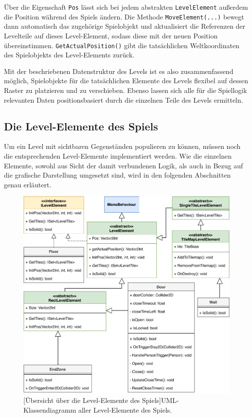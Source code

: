 Über die Eigenschaft \texttt{Pos} lässt sich bei jedem abstrakten \texttt{LevelElement} außerdem die Position während des Spiels ändern. Die Methode \texttt{MoveElement(...)} bewegt dann automatisch das zugehörige Spielobjekt und aktualisiert die Referenzen der Levelteile auf dieses Level-Element, sodass diese mit der neuen Position übereinstimmen. \texttt{GetActualPosition()} gibt die tatsächlichen Weltkoordinaten des Spielobjekts des Level-Elements zurück.

Mit der beschriebenen Datenstruktur des Levels ist es also zusammenfassend möglich, Spielobjekte für die tatsächlichen Elemente des Levels flexibel auf dessen Raster zu platzieren und zu verschieben. Ebenso lassen sich alle für die Spiellogik relevanten Daten positionsbasiert durch die einzelnen Teile des Levels ermitteln.
 
\subsection{Die Level-Elemente des Spiels}\label{sec:levelElements}
Um ein Level mit sichtbaren Gegenständen populieren zu können, müssen noch die entsprechenden Level-Elemente implementiert werden. Wie die einzelnen Elemente, sowohl aus Sicht der damit verbundenen Logik, als auch in Bezug auf die grafische Darstellung umgesetzt sind, wird in den folgenden Abschnitten genau erläutert.

\begin{figure}[h]
 \centering
 \includegraphics[width=0.86\linewidth]{diagrams/Level_Element_UML.pdf}
 [Übersicht über die Level-Elemente des Spiels]{UML-Klassendiagramm aller Level-Elemente des Spiels.}
	\label{fig:level_elements}
\end{figure}

